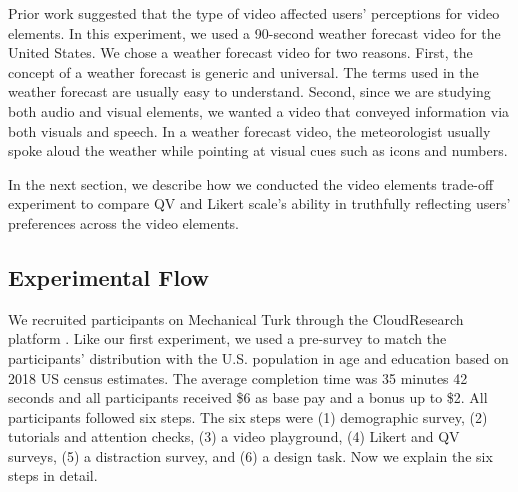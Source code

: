 Prior work suggested that the type of video affected users' perceptions for video elements. In this experiment, we used a 90-second weather forecast video for the United States. We chose a weather forecast video for two reasons. First, the concept of a weather forecast is generic and universal. The terms used in the weather forecast are usually easy to understand. Second, since we are studying both audio and visual elements, we wanted a video that conveyed information via both visuals and speech. In a weather forecast video, the meteorologist usually spoke aloud the weather while pointing at visual cues such as icons and numbers.

In the next section, we describe how we conducted the video elements trade-off experiment to compare QV and Likert scale's ability in truthfully reflecting users' preferences across the video elements.



\subsection{Experimental Flow}
We recruited participants on Mechanical Turk through the CloudResearch platform \cite{litman2017turkprime}. Like our first experiment, we used a pre-survey to match the participants' distribution with the U.S. population in age and education based on 2018 US census estimates. The average completion time was 35 minutes 42 seconds and all participants received \$6 as base pay and a bonus up to \$2. All participants followed six steps. The six steps were (1) demographic survey, (2) tutorials and attention checks, (3) a video playground, (4) Likert and QV surveys, (5) a distraction survey, and (6) a design task. Now we explain the six steps in detail. 

